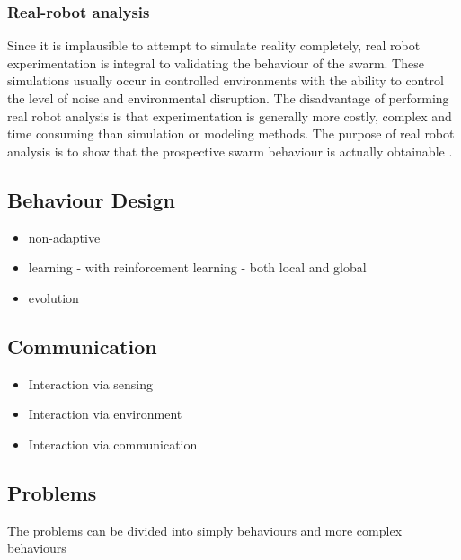 \subsubsection{Real-robot analysis}

Since it is implausible to attempt to simulate reality completely, real robot experimentation is integral to validating the behaviour of the swarm. These simulations usually occur in controlled environments with the ability to control the level of noise and environmental disruption. 
The disadvantage of performing real robot analysis is that experimentation is generally more costly, complex and time consuming than simulation or modeling methods. The purpose of real robot analysis is to show that the prospective swarm behaviour is actually obtainable \cite{brambilla2013swarm}.


\subsection{Behaviour Design}

\begin{itemize}
	\item non-adaptive
	\item learning - with reinforcement learning - both local and global
	\item evolution
\end{itemize}

\subsection{Communication}

\begin{itemize}
	\item Interaction via sensing
	\item Interaction via environment
	\item Interaction via communication
\end{itemize}

\subsection{Problems}
\label{swarmrobotapplications}

The problems can be divided into simply behaviours and more complex behaviours

